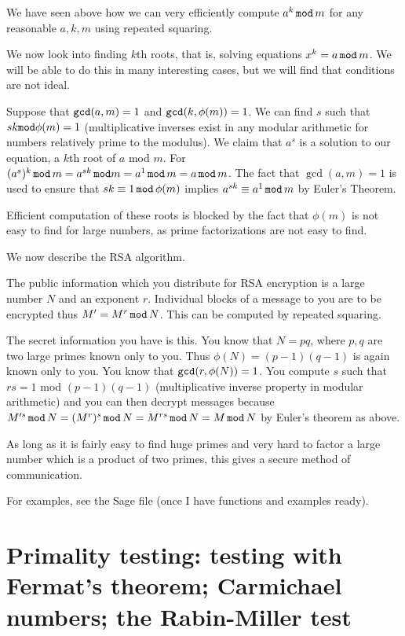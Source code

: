 \documentclass[12pt]{article}
\begin{document}
We have seen above how we can very efficiently compute $a^k\,{\tt mod}\,m$ for any reasonable $a,k,m$ using repeated squaring.

We now look into finding $k$th roots, that is, solving equations $x^k=a\,{\tt mod}\,m$.   We will be able to do this in many interesting cases, but we will find that conditions are not ideal.

Suppose that ${\tt gcd}(a,m)=1$ and ${\tt gcd}(k,\phi(m))=1$.   We can find $s$ such that $sk {\tt mod} \phi(m)=1$ (multiplicative inverses exist in any modular arithmetic for numbers relatively prime to the modulus).
We claim that $a^s$ is a solution to our equation, a $k$th root of $a$ mod $m$.   For $(a^s)^k \,{\tt mod}\,m=a^{sk} \, {\tt mod} m = a^1 \,{\tt mod}\, m = a \,{\tt mod}\, m$.   The fact that ${\gcd}(a,m)=1$
 is used to ensure that $sk\equiv 1\,{\tt mod}\,\phi(m)$ implies $a^{sk} \equiv a^1\,{\tt mod}\, m$ by Euler's Theorem.

Efficient computation of these roots is blocked by the fact that $\phi(m)$ is not easy to find for large numbers, as prime factorizations are not easy to find.


We now describe the RSA algorithm.

The public information which you distribute for RSA encryption is a large number $N$ and an exponent $r$.   Individual blocks of a message to you are to be encrypted thus $M'=M^r\,{\tt mod}\,N$.   This can be computed by repeated squaring.

The secret information you have is this.   You know that $N=pq$, where $p,q$ are two large primes known only to you.   Thus $\phi(N)=(p-1)(q-1)$ is again known only to you.  You know that ${\tt gcd}(r,\phi(N))=1$.
You compute $s$ such that $rs=1$ mod $(p-1)(q-1)$ (multiplicative inverse property in modular arithmetic) and you can then decrypt messages because $M'^s\,{\tt mod}\,N = (M^r)^s \,{\tt mod}\,N=M^{rs}\,{\tt mod}\,N= M\,{\tt mod}\,N$ by Euler's theorem as above.

As long as it is fairly easy to find huge primes and very hard to factor a large number which is a product of two primes, this gives a secure method of communication.

For examples, see the Sage file (once I have functions and examples ready).


\section{Primality testing:  testing with Fermat's theorem; Carmichael numbers; the Rabin-Miller test}
\end{document}

